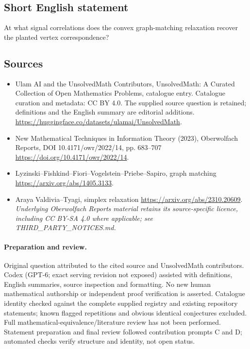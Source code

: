 \documentclass[11pt]{article}
\begin{document}
\subsection{Short English statement}
At what signal correlations does the convex graph-matching relaxation recover the planted vertex correspondence?
\subsection{Sources}
\begin{itemize}
\item[\hypertarget{source:statement:1}{S1}] Ulam AI and the UnsolvedMath Contributors, UnsolvedMath: A Curated Collection of Open Mathematics Problems, catalogue entry. Catalogue curation and metadata: CC BY 4.0. The supplied source question is retained; definitions and the English summary are editorial additions.
\url{https://huggingface.co/datasets/ulamai/UnsolvedMath}.
\item[\hypertarget{source:statement:2}{S2}] New Mathematical Techniques in Information Theory (2023), Oberwolfach Reports, DOI 10.4171/owr/2022/14, pp. 683--707
\url{https://doi.org/10.4171/owr/2022/14}.
\item[\hypertarget{source:statement:3}{S3}] Lyzinski--Fishkind--Fiori--Vogelstein--Priebe--Sapiro, graph matching
\url{https://arxiv.org/abs/1405.3133}.
\item[\hypertarget{source:statement:4}{S4}] Araya Valdivia--Tyagi, simplex relaxation
\url{https://arxiv.org/abs/2310.20609}.
\textit{Underlying Oberwolfach Reports material retains its source-specific licence, including CC BY-SA 4.0 where applicable; see THIRD\_PARTY\_NOTICES.md.}
\end{itemize}
\paragraph{Preparation and review.}
Original question attributed to the cited source and UnsolvedMath contributors. Codex (GPT-6; exact serving revision not exposed) assisted with definitions, English summaries, source inspection and formatting. No new human mathematical authorship or independent proof verification is asserted. Catalogue identity checked against the complete supplied registry and existing repository statements; known flagged repetitions and obvious identical conjectures excluded. Full mathematical-equivalence/literature review has not been performed. Statement preparation and final review followed contribution prompts C and D; automated checks verify structure and identity, not open status.
\label{end:statement}
\end{document}
